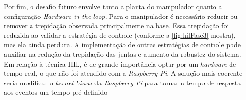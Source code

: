 Por fim, o desafio futuro envolve tanto a planta do manipulador quanto a configuração \textit{Hardware in the loop}. Para o
manipulador é necessário reduzir ou remover a trepidação observada principalmente na base. Essa trepidação foi reduzida ao
validar a estratégia de controle (conforme a \autoref{fig:hilFase3} mostra), mas ela ainda perdura.
A implementação de outras estratégias de controle pode auxiliar na redução da trepidação das juntas e aumento da robustez do sistema.
Em relação à técnica HIL, é de grande importância optar por um \textit{hardware} de tempo real, o que não foi atendido com a \textit{Raspberry Pi}.
A solução mais coerente seria modificar o \textit{kernel} \textit{Linux} da \textit{Raspberry Pi} para tornar o tempo 
de resposta aos eventos um tempo pré-definido.



